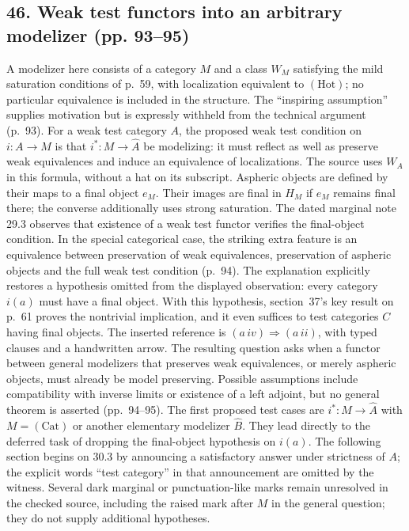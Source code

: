 \documentclass[10pt,oneside]{book}
\begin{document}
\subsection*{46. Weak test functors into an arbitrary modelizer (pp. 93--95)}
A modelizer here consists of a category $M$ and a class $W_M$ satisfying the mild saturation conditions of p.~59, with localization equivalent to $(\mathrm{Hot})$; no particular equivalence is included in the structure. The ``inspiring assumption'' supplies motivation but is expressly withheld from the technical argument (p.~93). For a weak test category $A$, the proposed weak test condition on $i:A\to M$ is that $i^*:M\to\widehat A$ be modelizing: it must reflect as well as preserve weak equivalences and induce an equivalence of localizations. The source uses $W_A$ in this formula, without a hat on its subscript. Aspheric objects are defined by their maps to a final object $e_M$. Their images are final in $H_M$ if $e_M$ remains final there; the converse additionally uses strong saturation. The dated marginal note 29.3 observes that existence of a weak test functor verifies the final-object condition. In the special categorical case, the striking extra feature is an equivalence between preservation of weak equivalences, preservation of aspheric objects and the full weak test condition (p.~94). The explanation explicitly restores a hypothesis omitted from the displayed observation: every category $i(a)$ must have a final object. With this hypothesis, section~37's key result on p.~61 proves the nontrivial implication, and it even suffices to test categories $C$ having final objects. The inserted reference is $(a\,iv)\Rightarrow(a\,ii)$, with typed clauses and a handwritten arrow. The resulting question asks when a functor between general modelizers that preserves weak equivalences, or merely aspheric objects, must already be model preserving. Possible assumptions include compatibility with inverse limits or existence of a left adjoint, but no general theorem is asserted (pp.~94--95). The first proposed test cases are $i^*:M\to\widehat A$ with $M=(\mathrm{Cat})$ or another elementary modelizer $\widehat B$. They lead directly to the deferred task of dropping the final-object hypothesis on $i(a)$. The following section begins on 30.3 by announcing a satisfactory answer under strictness of $A$; the explicit words ``test category'' in that announcement are omitted by the witness. Several dark marginal or punctuation-like marks remain unresolved in the checked source, including the raised mark after $M$ in the general question; they do not supply additional hypotheses.
\end{document}
